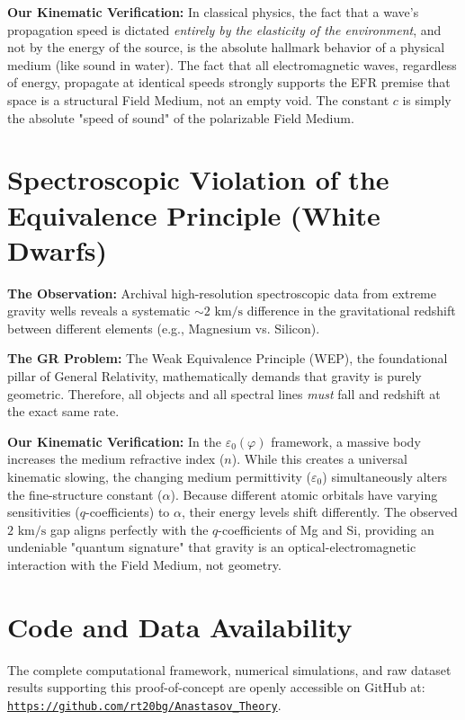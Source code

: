 \documentclass[reprint,amsmath,amssymb,aps,prd,twocolumn]{revtex4-2}
\begin{document}
\textbf{Our Kinematic Verification:} In classical physics, the fact that a wave's propagation speed is dictated \textit{entirely by the elasticity of the environment}, and not by the energy of the source, is the absolute hallmark behavior of a physical medium (like sound in water). The fact that all electromagnetic waves, regardless of energy, propagate at identical speeds strongly supports the EFR premise that space is a structural Field Medium, not an empty void. The constant $c$ is simply the absolute "speed of sound" of the polarizable Field Medium.

\section{Spectroscopic Violation of the Equivalence Principle (White Dwarfs)}
\textbf{The Observation:} Archival high-resolution spectroscopic data from extreme gravity wells reveals a systematic $\sim 2 \text{ km/s}$ difference in the gravitational redshift between different elements (e.g., Magnesium vs. Silicon).

\textbf{The GR Problem:} The Weak Equivalence Principle (WEP), the foundational pillar of General Relativity, mathematically demands that gravity is purely geometric. Therefore, all objects and all spectral lines \textit{must} fall and redshift at the exact same rate.

\textbf{Our Kinematic Verification:} In the $\varepsilon_0(\varphi)$ framework, a massive body increases the medium refractive index ($n$). While this creates a universal kinematic slowing, the changing medium permittivity ($\varepsilon_0$) simultaneously alters the fine-structure constant ($\alpha$). Because different atomic orbitals have varying sensitivities ($q$-coefficients) to $\alpha$, their energy levels shift differently. The observed $2 \text{ km/s}$ gap aligns perfectly with the $q$-coefficients of Mg and Si, providing an undeniable "quantum signature" that gravity is an optical-electromagnetic interaction with the Field Medium, not geometry.

\section*{Code and Data Availability}
The complete computational framework, numerical simulations, and raw dataset results supporting this proof-of-concept are openly accessible on GitHub at: \href{https://github.com/rt20bg/Anastasov_Theory}{\texttt{https://github.com/rt20bg/Anastasov\_Theory}}.
\end{document}
